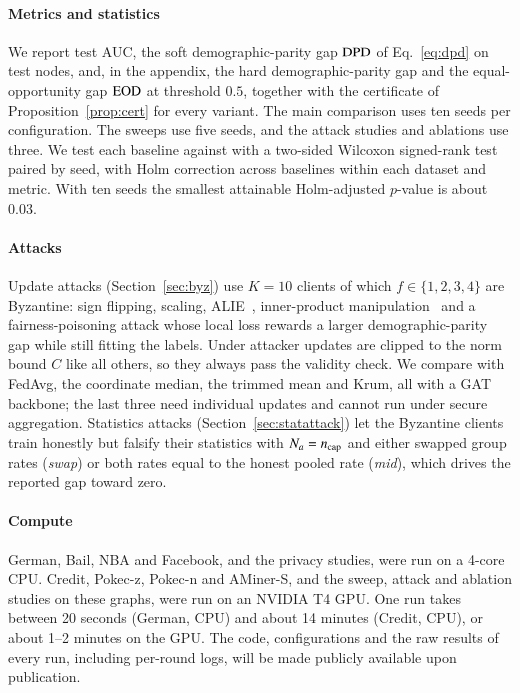 \paragraph{Metrics and statistics}
We report test AUC, the soft demographic-parity gap $\mathrm{DPD}$ of Eq.~\eqref{eq:dpd} on test nodes, and, in the appendix, the hard demographic-parity gap and the equal-opportunity gap $\mathrm{EOD}$ at threshold $0.5$, together with the certificate of Proposition~\ref{prop:cert} for every \clamp{} variant. The main comparison uses ten seeds per configuration. The sweeps use five seeds, and the attack studies and ablations use three. We test each baseline against \clamp{} with a two-sided Wilcoxon signed-rank test paired by seed, with Holm correction across baselines within each dataset and metric. With ten seeds the smallest attainable Holm-adjusted $p$-value is about 0.03.

\paragraph{Attacks}
Update attacks (Section~\ref{sec:byz}) use $K=10$ clients of which $f\in\{1,2,3,4\}$ are Byzantine: sign flipping, scaling, ALIE~\citep{baruch2019little}, inner-product manipulation~\citep{xie2019fall} and a fairness-poisoning attack whose local loss rewards a larger demographic-parity gap while still fitting the labels. Under \clamp{} attacker updates are clipped to the norm bound $C$ like all others, so they always pass the validity check. We compare \clamp{} with FedAvg, the coordinate median, the trimmed mean and Krum, all with a GAT backbone; the last three need individual updates and cannot run under secure aggregation. Statistics attacks (Section~\ref{sec:statattack}) let the Byzantine clients train honestly but falsify their statistics with $N_a=n_{\mathrm{cap}}$ and either swapped group rates (\emph{swap}) or both rates equal to the honest pooled rate (\emph{mid}), which drives the reported gap toward zero.

\paragraph{Compute}
German, Bail, NBA and Facebook, and the privacy studies, were run on a 4-core CPU. Credit, Pokec-z, Pokec-n and AMiner-S, and the sweep, attack and ablation studies on these graphs, were run on an NVIDIA T4 GPU. One run takes between 20 seconds (German, CPU) and about 14 minutes (Credit, CPU), or about 1--2 minutes on the GPU. The code, configurations and the raw results of every run, including per-round logs, will be made publicly available upon publication.
